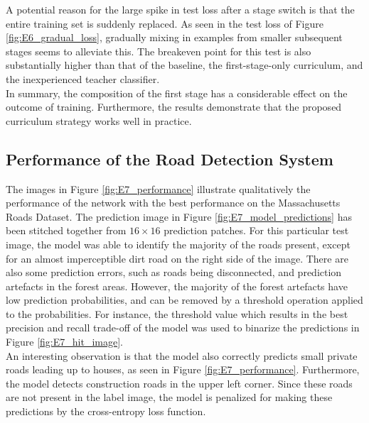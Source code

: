 A potential reason for the large spike in test loss after a stage switch is that the entire training set is suddenly replaced. As seen in the test loss of Figure \ref{fig:E6_gradual_loss}, gradually mixing in examples from smaller subsequent stages seems to alleviate this. The breakeven point for this test is also substantially higher than that of  the baseline, the first-stage-only curriculum, and the inexperienced teacher classifier.\\

In summary, the composition of the first stage has a considerable effect on the outcome of training. Furthermore, the results demonstrate that the proposed curriculum strategy works well in practice.

\subsection{Performance of the Road Detection System}
The images in Figure \ref{fig:E7_performance} illustrate qualitatively the performance of the network with the best performance on the Massachusetts Roads Dataset. The prediction image in Figure \ref{fig:E7_model_predictions} has been stitched together from $16 \times 16$ prediction patches. For this particular test image, the model was able to identify the majority of the roads present, except for an almost imperceptible dirt road on the right side of the image. There are  also some prediction errors, such as roads being disconnected, and prediction artefacts in the forest areas. However, the majority of the forest artefacts have low prediction probabilities, and can be removed by a threshold operation applied to the probabilities. For instance, the threshold value which results in the best precision and recall trade-off of the model was used to binarize the predictions in Figure \ref{fig:E7_hit_image}.\\

An interesting observation is that the model also correctly predicts small private roads leading up to houses, as seen in Figure \ref{fig:E7_performance}. Furthermore, the model detects construction roads in the upper left corner. Since these roads are not present in the label image, the model is penalized for making these predictions by the cross-entropy loss function.\\

